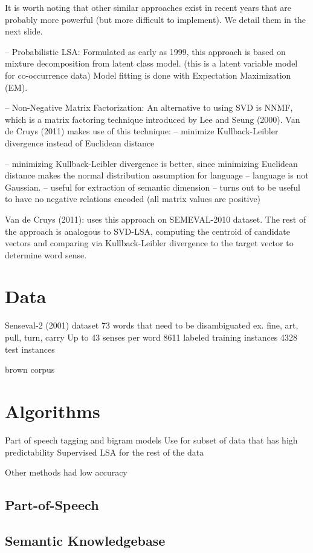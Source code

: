 \documentclass[10pt, letterpaper]{article}
\begin{document}
	It is worth noting that other similar approaches exist in recent years that are probably more powerful (but more difficult to implement). We detail them in the next slide. 

	-- Probabilistic LSA: Formulated as early as 1999, this approach is based on mixture decomposition from latent class model. 
	(this is a latent variable model for co-occurrence data)
	Model fitting is done with Expectation Maximization (EM).

	-- Non-Negative Matrix Factorization: An alternative to using SVD is NNMF, which is a matrix factoring technique introduced by Lee and Seung  (2000).  Van de Cruys (2011) makes use of this technique:
	-- minimize Kullback-Leibler divergence instead of Euclidean distance

	-- minimizing Kullback-Leibler divergence is better, since minimizing Euclidean distance makes the normal distribution assumption for language -- language is not Gaussian.
	-- useful for extraction of semantic dimension 
	-- turns out to be useful to have no negative relations encoded (all matrix values are positive)

	Van de Cruys (2011): uses this approach on SEMEVAL-2010 dataset. The rest of the approach is analogous to SVD-LSA, computing the centroid  of candidate vectors and comparing via Kullback-Leibler divergence to the target vector to determine word sense. 

	\section{Data}
	Senseval-2 (2001) dataset
	73 words that need to be disambiguated
	         ex. fine, art, pull, turn, carry
	Up to 43 senses per word
	8611 labeled training instances
	4328 test instances	

	brown corpus

	\section{Algorithms}
	 Part of speech tagging and bigram models
 	 Use for subset of data that has high predictability
 	 Supervised LSA for the rest of the data

 	 Other methods had low accuracy 
 	\subsection{Part-of-Speech}
 	\subsection{Semantic Knowledgebase}
\end{document}
